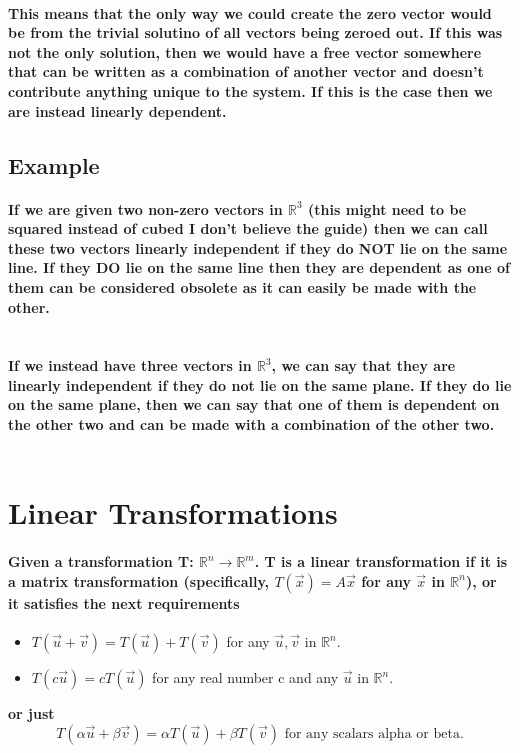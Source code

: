 \documentclass{report}
\begin{document}
\begin{multicols}{2}
\paragraph{This means that the only way we could create the zero vector would be from the trivial solutino of all vectors being zeroed out. If this was not the only solution, then we would have a free vector somewhere that can be written as a combination of another vector and doesn't contribute anything unique to the system. If this is the case then we are instead linearly dependent. }
\subsection{Example}%
\label{sub: Example }
\paragraph{If we are given two non-zero vectors in $ \mathbb{R}^3 $ (this might need to be squared instead of cubed I don't believe the guide) then we can call these two vectors linearly independent if they do NOT lie on the same line. If they DO lie on the same line then they are dependent as one of them can be considered obsolete as it can easily be made with the other. \\ \\}

\paragraph{If we instead have three vectors in $ \mathbb{R}^3 $, we can say that they are linearly independent if they do not lie on the same plane. If they do lie on the same plane, then we can say that one of them is dependent on the other two and can be made with a combination of the other two. \\ \\}

\section{Linear Transformations}%
\label{sec: Linear Transformations }
\paragraph{Given a transformation T: $ \mathbb{R}^{ n } \to \mathbb{R}^{ m } $. T is a linear transformation if it is a matrix transformation (specifically, $ T\left( \vec{ x } \right)  = A \vec{ x } $ for any $ \vec{ x } $ in $ \mathbb{R}^{ n } $), or it satisfies the next requirements }
\begin{itemize}
	\item $ T\left( \vec{ u } + \vec{ v } \right) = T\left( \vec{ u } \right) + T\left( \vec{ v } \right)  $ for any $ \vec{ u }, \vec{ v } $ in $ \mathbb{R}^{ n } $. 
	\item $ T\left( c \vec{ u } \right) = cT\left( \vec{ u } \right)  $ for any real number c and any $ \vec{ u } $ in $ \mathbb{R}^{ n } $.
\end{itemize}
\textbf{or just}
\[
T\left( \alpha \vec{ u } + \beta \vec{ v } \right)  = \alpha T\left( \vec{ u } \right) + \beta T\left( \vec{ v } \right) \text{ for any scalars alpha or beta}
.\] 

\end{multicols}
\end{document}

